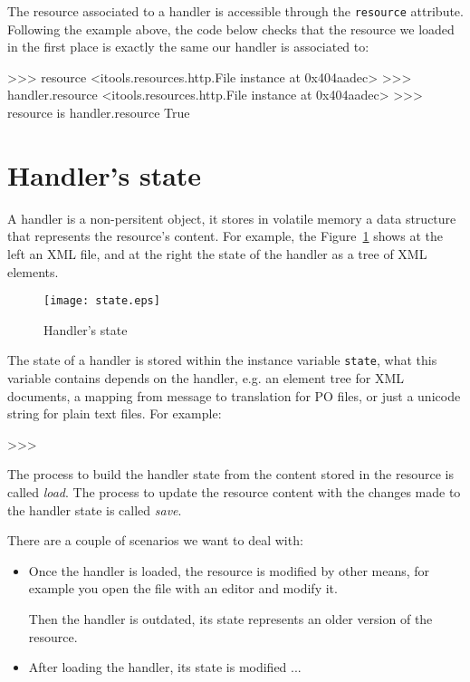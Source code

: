 The resource associated to a handler is accessible through the {\tt resource}
attribute. Following the example above, the code below checks that the
resource we loaded in the first place is exactly the same our handler is
associated to:

\begin{code}
    >>> resource
    <itools.resources.http.File instance at 0x404aadec>
    >>> handler.resource
    <itools.resources.http.File instance at 0x404aadec>
    >>> resource is handler.resource
    True
\end{code}


\section{Handler's state}

A handler is a non-persitent object, it stores in volatile memory a data
structure that represents the resource's content. For example, the
Figure~\ref{Figure: state} shows at the left an XML file, and at the
right the state of the handler as a tree of XML elements.

\begin{figure}
  \center
  \texttt{[image: state.eps]}
  \caption{Handler's state}
  \label{Figure: state}
\end{figure}

The state of a handler is stored within the instance variable {\tt state},
what this variable contains depends on the handler, e.g. an element tree
for XML documents, a mapping from message to translation for PO files, or
just a unicode string for plain text files. For example:

\begin{code}
    >>> 
\end{code}

The process to build the handler state from the content stored in the
resource is called {\em load}. The process to update the resource content
with the changes made to the handler state is called {\em save}.

There are a couple of scenarios we want to deal with:

\begin{itemize}
  \item Once the handler is loaded, the resource is modified by other
    means, for example you open the file with an editor and modify it.

    Then the handler is outdated, its state represents an older version
    of the resource.

  \item After loading the handler, its state is modified ...
\end{itemize}




